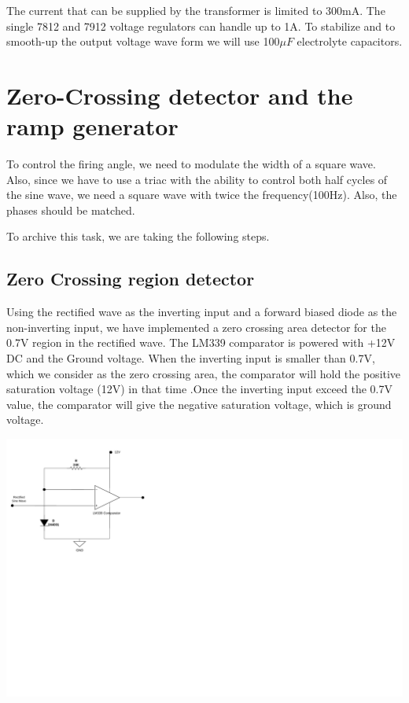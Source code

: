 \begin{multicols}{2}
The current that can be supplied by the transformer is limited to 300mA. The single 7812 and 7912 voltage regulators can handle up to 1A. To stabilize and to smooth-up the output voltage wave form we will use 100$\mu F$ electrolyte capacitors.

\section{Zero-Crossing detector and the ramp generator }
To control the firing angle, we need to modulate the width of a square wave. Also, since we have to use a triac with the ability to control both half cycles of the sine wave, we need a square wave with twice the frequency(100Hz). Also, the phases should be matched.

To archive this task, we are taking the following steps.

\subsection{ Zero Crossing region detector}

Using the rectified wave as the inverting input and a forward biased diode as the non-inverting input, we have implemented a zero crossing area detector for the 0.7V region in the rectified wave. The LM339 comparator is powered with +12V DC and the Ground voltage. 
When the inverting input is smaller than 0.7V, which we consider as the zero crossing area, the comparator will hold the positive saturation voltage (12V) in that time .Once the inverting input exceed the 0.7V value, the comparator will give the negative saturation voltage, which is ground voltage.

\begin{minipage}{0.45\textwidth}
\centering
\includegraphics[width=\textwidth]{Method/Ze_Area Pluse.drawio.pdf}
\end{minipage}


\end{multicols}
